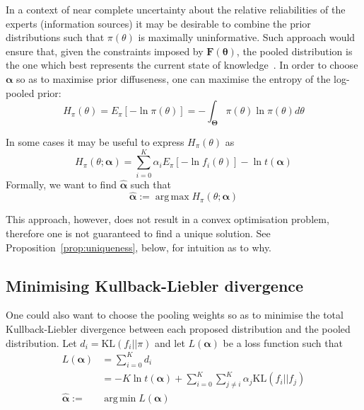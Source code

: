 \documentclass[a4paper, notitlepage, 10pt]{article}
\DeclareMathOperator*{\argmin}{arg\,min}
\DeclareMathOperator*{\argmax}{arg\,max}
\begin{document}
In a context of near complete uncertainty about the relative reliabilities of the experts (information sources) it may be desirable to combine the prior distributions such that $\pi(\theta)$ is maximally uninformative.
Such approach would ensure that, given the constraints imposed by $\mathbf{F(\theta)}$, the pooled distribution is the one which best represents the current state of knowledge~\citep{jaynes1957,savchuk1994}.
In order to choose $\boldsymbol\alpha$ so as to maximise prior 
diffuseness, one can maximise the entropy of the log-pooled prior:
\begin{equation}
\label{eq:entropypiA}
H_{\pi}(\theta) = E_{\pi}\left[-\ln\pi(\theta) \right] =-\int_{\boldsymbol\Theta}\pi(\theta)\ln\pi(\theta)d\theta 
\end{equation}

In some cases it may be useful to express $H_{\pi}(\theta)$ as
\begin{equation}
\label{eq:entropypiB}
 H_{\pi}(\theta; \boldsymbol\alpha) = \sum_{i=0}^{K} \alpha_i E_{\pi}[ - \ln f_i(\theta)] - \ln t(\boldsymbol\alpha)
\end{equation}
Formally, we want to find $\hat{\boldsymbol\alpha}$ such that
\begin{equation}
\label{eq:argmaxEnt}
 \hat{\boldsymbol\alpha}:= \argmax H_{\pi}(\theta; \boldsymbol\alpha)  
\end{equation}

This approach, however, does not result in a convex optimisation problem, therefore one is not guaranteed to find a unique solution. 
See Proposition~\ref{prop:uniqueness}, below, for intuition as to why.

\subsection*{Minimising Kullback-Liebler divergence}

One could also want to choose the pooling weights so as to minimise the total Kullback-Liebler divergence between each proposed distribution and the pooled distribution.
Let $d_i = \text{KL}(f_i || \pi)$ and let $L(\boldsymbol\alpha)$ be a loss function such that
\begin{align}
L(\boldsymbol\alpha) &= \sum_{i=0}^Kd_i \\
\label{eq:KLexpanded}
     &= -K\ln t(\boldsymbol\alpha) + \sum_{i=0}^K\sum_{j\neq i}^K\alpha_j\text{KL}(f_i||f_j) \\
     \label{eq:argminKL}
     \hat{\boldsymbol\alpha}:=& \argmin L(\boldsymbol\alpha)   
\end{align}
\end{document}
